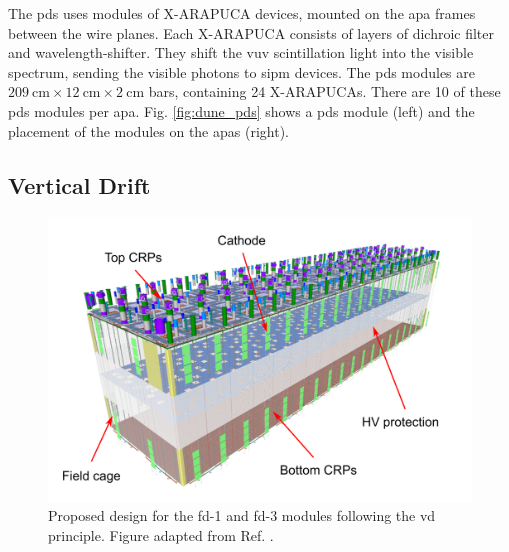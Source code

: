 The \gls{pds} uses modules of X-ARAPUCA devices, mounted on the \gls{apa} frames between the wire planes. Each X-ARAPUCA consists of layers of dichroic filter and wavelength-shifter. They shift the \gls{vuv} scintillation light into the visible spectrum, sending the visible photons to \gls{sipm} devices. The \gls{pds} modules are $209~\mathrm{cm}\times12~\mathrm{cm}\times2~\mathrm{cm}$ bars, containing 24 X-ARAPUCAs. There are 10 of these \gls{pds} modules per \gls{apa}. Fig. \ref{fig:dune_pds} shows a \gls{pds} module (left) and the placement of the modules on the \gls{apa}s (right).

\subsection{Vertical Drift}

\begin{figure}[t]
	\centering
	\includegraphics[width=0.70\linewidth]{Images/DUNE/FD/dune_vd}
	\caption[Proposed design for the \gls{fd}-1 and \gls{fd}-3 modules following the \gls{vd} principle.]{Proposed design for the \gls{fd}-1 and \gls{fd}-3 modules following the \gls{vd} principle. Figure adapted from Ref. \cite{DUNEVDTDR}.}
	\label{fig:dune_vd}
\end{figure}

